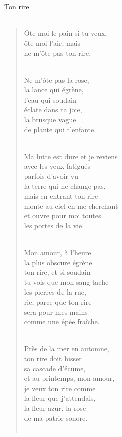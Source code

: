 \documentclass[11pt,a4paper]{book}
\begin{document}
\newpage

{\huge Ton rire} \\ \\

\begin{verse}
Ôte-moi le pain si tu veux, \\
ôte-moi l'air, mais \\
ne m'ôte pas ton rire. \\ \

Ne m'ôte pas la rose, \\
la lance qui égrène, \\
l'eau qui soudain \\
éclate dans ta joie, \\
la brusque vague \\
de plante qui t'enfante. \\ \

Ma lutte est dure et je reviens \\
avec les yeux fatigués \\
parfois d'avoir vu \\
la terre qui ne change pas, \\
mais en entrant ton rire \\
monte au ciel en me cherchant \\
et ouvre pour moi toutes \\
les portes de la vie. \\ \

Mon amour, à l'heure \\
la plus obscure égrène \\
ton rire, et si soudain \\
tu vois que mon sang tache \\
les pierres de la rue, \\
rie, parce que ton rire \\
sera pour mes mains \\
comme une épée fraîche. \\ \

Près de la mer en automne, \\
ton rire doit hisser \\
sa cascade d'écume, \\
et au printemps, mon amour, \\
je veux ton rire comme \\
la fleur que j'attendais, \\
la fleur azur, la rose \\
de ma patrie sonore. \\ \


\end{verse}
\end{document}
